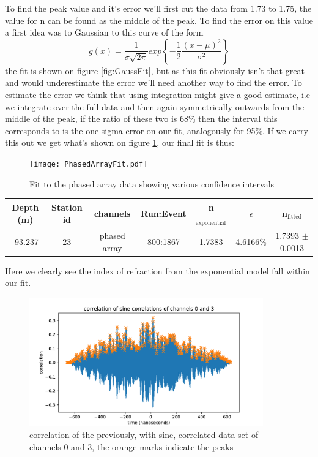 To find the peak value and it's error we'll first cut the data from
1.73 to 1.75, the value for n can be found as the middle of the
peak. To find the error on this value a first idea was to Gaussian
to this curve of the
form\cite{grabe2005measurement}
\begin{equation}
	g(x) = \frac{1}{\sigma \sqrt{2\pi}} exp\left\{-\frac{1}{2}\frac{(x-\mu)^2}{\sigma^2}\right\}
\end{equation}
the fit is shown on figure \ref{fig:GaussFit}, but as this fit obviously isn't
that great and would underestimate the error we'll need another way to find the
error.  To estimate the error we think that using integration might give a good
estimate, i.e we integrate over the full data and then again symmetrically
outwards from the middle of the peak, if the ratio of these two is 68\% then
the interval this corresponds to is the one sigma error on our fit, analogously
for 95\%. If we carry this out we get what's shown on figure
\ref{fig:PhasedArrayFit}, our final fit is thus:
\begin{figure}
	\centering
	\texttt{[image: PhasedArrayFit.pdf]}
	\caption{Fit to the phased array data showing various confidence intervals}
	\label{fig:PhasedArrayFit}
\end{figure}
\begin{center}
\begin{tabular}{||c c c c c c c||}
 \hline
 Depth (m) & Station id & channels & Run:Event & n$_\text{exponential}$ & $\epsilon$ & n$_\text{fitted}$\\ [0.5ex]
 \hline\hline
 -93.237 & 23 & phased array & 800:1867 & 1.7383 & 4.6166\% & 1.7393 $\pm$ 0.0013 \\
 \hline
\end{tabular}
\end{center}
Here we clearly see the index of refraction from the exponential model fall within our fit.
\begin{figure}
	\centering
	\includegraphics[width=0.9\textwidth]{figures/crosscorrelation.pdf}
	\caption{correlation of the previously, with sine, correlated data set
	of channels 0 and 3, the orange marks indicate the peaks}
	\label{fig:CrossCorr}
\end{figure}
